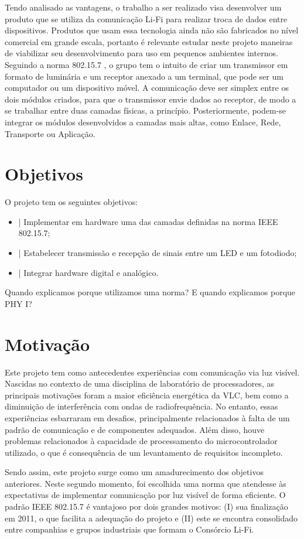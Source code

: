 	Tendo analisado as vantagens, o trabalho a ser realizado visa desenvolver um produto que se utiliza da comunicação Li-Fi para realizar troca de dados entre dispositivos. Produtos que usam essa tecnologia ainda não são fabricados no nível comercial em grande escala, portanto é relevante estudar neste projeto maneiras de viabilizar seu desenvolvimento para uso em pequenos ambientes internos. Seguindo a norma 802.15.7 \cite{lifi-standard}, o grupo tem o intuito de criar um transmissor em formato de luminária e um receptor anexado a um terminal, que pode ser um computador ou um dispositivo móvel. A comunicação deve ser simplex entre os dois módulos criados, para que o transmissor envie dados ao receptor, de modo a se trabalhar entre duas camadas físicas, a princípio. Posteriormente, podem-se integrar os módulos desenvolvidos a camadas mais altas, como Enlace, Rede, Transporte ou Aplicação.

	\section*{Objetivos}\label{sec-objetivos}
	
	O projeto tem os seguintes objetivos:
	
	\begin{itemize}
		\item |	Implementar em hardware uma das camadas definidas na norma IEEE 802.15.7;
		\item |	Estabelecer transmissão e recepção de sinais entre um LED e um fotodiodo;
		\item |	Integrar hardware digital e analógico.
	\end{itemize}

	Quando explicamos porque utilizamos uma norma?
	E quando explicamos porque PHY I?

	\section*{Motivação}\label{sec-motivacao}

	Este projeto tem como antecedentes experiências com comunicação via luz visível. Nascidas no contexto de uma disciplina de laboratório de processadores, as principais motivações foram a maior eficiência energética da VLC, bem como a diminuição de interferência com ondas de radiofrequência. No entanto, essas experiências esbarraram em desafios, principalmente relacionados à falta de um padrão de comunicação e de componentes adequados. Além disso, houve problemas relacionados à capacidade de processamento do microcontrolador utilizado, o que é consequência de um levantamento de requisitos incompleto.

	Sendo assim, este projeto surge como um amadurecimento dos objetivos anteriores. Neste segundo momento, foi escolhida uma norma que atendesse às expectativas de implementar comunicação por luz visível de forma eficiente. O padrão IEEE 802.15.7 é vantajoso por dois grandes motivos:
	(I) sua finalização em 2011, o que facilita a adequação do projeto e (II) este se encontra consolidado entre companhias e grupos industriais que formam o Consórcio Li-Fi.
